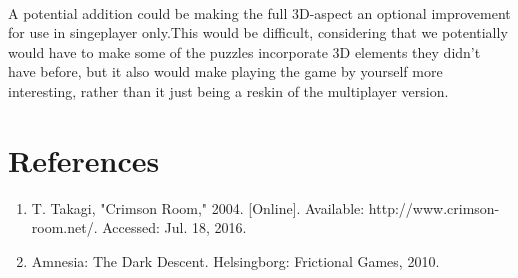 \documentclass[11pt]{article}
\begin{document}
~\\
A potential addition could be making the full 3D-aspect an optional improvement for use in singeplayer only.This would be difficult, considering that we potentially would have to make some of the puzzles incorporate 3D elements they didn't have before, but it also would make playing the game by yourself more interesting, rather than it just being a reskin of the multiplayer version. 

\newpage
{}
{}
\section*{References}
\begin{enumerate}
\item T. Takagi, "Crimson Room," 2004. [Online]. Available: http://www.crimson-room.net/. Accessed: Jul. 18, 2016.
\item Amnesia: The Dark Descent. Helsingborg: Frictional Games, 2010.	
\end{enumerate}
\end{document}
